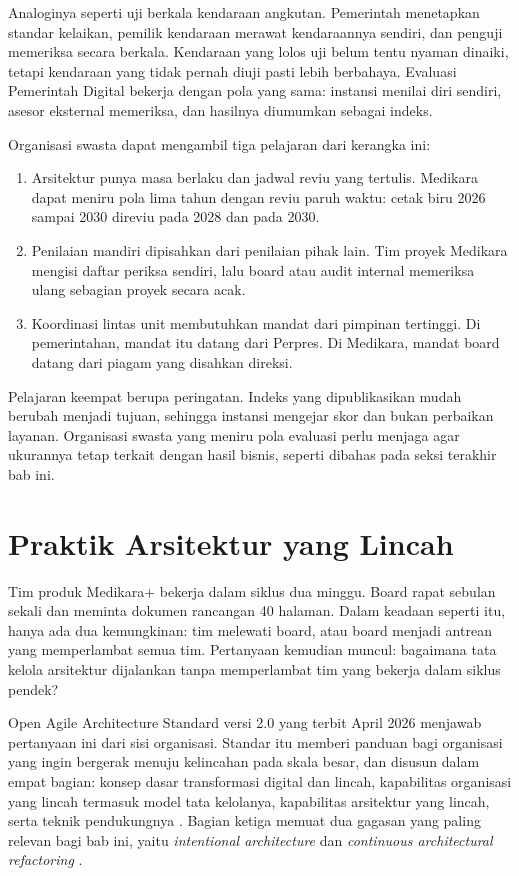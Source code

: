 Analoginya seperti uji berkala kendaraan angkutan. Pemerintah menetapkan
standar kelaikan, pemilik kendaraan merawat kendaraannya sendiri, dan
penguji memeriksa secara berkala. Kendaraan yang lolos uji belum tentu
nyaman dinaiki, tetapi kendaraan yang tidak pernah diuji pasti lebih
berbahaya. Evaluasi Pemerintah Digital bekerja dengan pola yang sama:
instansi menilai diri sendiri, asesor eksternal memeriksa, dan hasilnya
diumumkan sebagai indeks.

Organisasi swasta dapat mengambil tiga pelajaran dari kerangka ini:

\begin{enumerate}
  \item Arsitektur punya masa berlaku dan jadwal reviu yang tertulis.
        Medikara dapat meniru pola lima tahun dengan reviu paruh waktu:
        cetak biru 2026 sampai 2030 direviu pada 2028 dan pada 2030.
  \item Penilaian mandiri dipisahkan dari penilaian pihak lain. Tim proyek
        Medikara mengisi daftar periksa sendiri, lalu board atau audit
        internal memeriksa ulang sebagian proyek secara acak.
  \item Koordinasi lintas unit membutuhkan mandat dari pimpinan tertinggi.
        Di pemerintahan, mandat itu datang dari Perpres. Di Medikara,
        mandat board datang dari piagam yang disahkan direksi.
\end{enumerate}

Pelajaran keempat berupa peringatan. Indeks yang dipublikasikan mudah
berubah menjadi tujuan, sehingga instansi mengejar skor dan bukan perbaikan
layanan. Organisasi swasta yang meniru pola evaluasi perlu menjaga agar
ukurannya tetap terkait dengan hasil bisnis, seperti dibahas pada seksi
terakhir bab ini.

\section{Praktik Arsitektur yang Lincah}

Tim produk Medikara+ bekerja dalam siklus dua minggu. Board rapat sebulan
sekali dan meminta dokumen rancangan 40 halaman. Dalam keadaan seperti itu,
hanya ada dua kemungkinan: tim melewati board, atau board menjadi antrean
yang memperlambat semua tim. Pertanyaan kemudian muncul: bagaimana tata
kelola arsitektur dijalankan tanpa memperlambat tim yang bekerja dalam
siklus pendek?

Open Agile Architecture Standard versi 2.0 yang terbit April 2026
menjawab pertanyaan ini dari sisi organisasi. Standar itu memberi panduan
bagi organisasi yang ingin bergerak menuju kelincahan pada skala besar, dan
disusun dalam empat bagian: konsep dasar transformasi digital dan lincah,
kapabilitas organisasi yang lincah termasuk model tata kelolanya, kapabilitas
arsitektur yang lincah, serta teknik pendukungnya \cite{oaa2}. Bagian
ketiga memuat dua gagasan yang paling relevan bagi bab ini, yaitu
\textit{intentional architecture} dan \textit{continuous architectural
refactoring} \cite{oaa2}.

